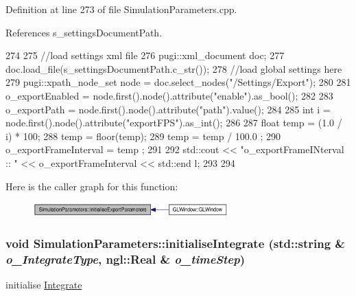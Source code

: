 Definition at line 273 of file SimulationParameters.cpp.



References s\_\-settingsDocumentPath.




\begin{DoxyCode}
274 {
275     //load settings xml file
276     pugi::xml_document doc;
277     doc.load_file(s_settingsDocumentPath.c_str());
278     //load global settings here
279     pugi::xpath_node_set node = doc.select_nodes("/Settings/Export");
280 
281     o_exportEnabled = node.first().node().attribute("enable").as_bool();
282 
283     o_exportPath = node.first().node().attribute("path").value();
284 
285     int i  = node.first().node().attribute("exportFPS").as_int();
286 
287     float temp = (1.0 / i) * 100;
288     temp = floor(temp);
289     temp = temp / 100.0 ;
290     o_exportFrameInterval = temp ;
291 
292     std::cout << "o_exportFrameINterval :: " << o_exportFrameInterval << std::end
      l;
293 
294 }
\end{DoxyCode}




Here is the caller graph for this function:\nopagebreak
\begin{figure}[H]
\begin{center}
\leavevmode
\includegraphics[width=214pt]{class_simulation_parameters_a216667d44e3d5498187a54ea1aa05116_icgraph}
\end{center}
\end{figure}


\hypertarget{class_simulation_parameters_a3ed48742e248d138da5cbe4d5068b576}{
\subsubsection[{initialiseIntegrate}]{\setlength{\rightskip}{0pt plus 5cm}void SimulationParameters::initialiseIntegrate (std::string \& {\em o\_\-IntegrateType}, \/  ngl::Real \& {\em o\_\-timeStep})}}
\label{class_simulation_parameters_a3ed48742e248d138da5cbe4d5068b576}


initialise \hyperlink{class_integrate}{Integrate} 


